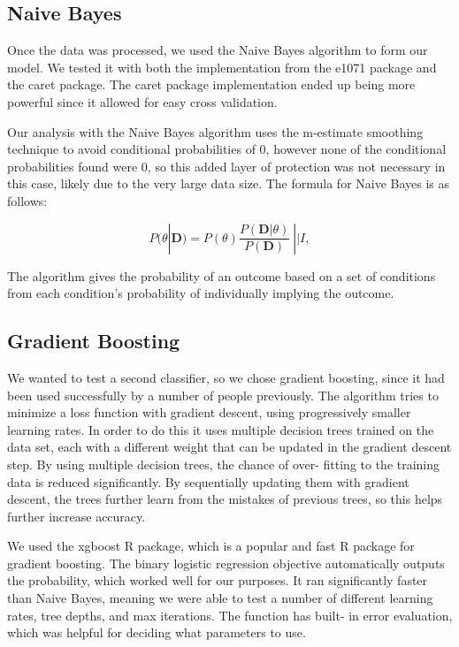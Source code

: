 \documentclass[fleqn,10pt]{SelfArx} %
\begin{document}
\subsection{Naive Bayes}
Once the data was processed, we used the Naive Bayes algorithm to form our model. We tested it with both the implementation from the e1071 package and the caret package. The caret package implementation ended up being more powerful since it allowed for easy cross validation. 

Our analysis with the Naive Bayes algorithm uses the m-estimate smoothing technique to avoid conditional probabilities of 0, however none of the conditional probabilities found were 0, so this added layer of protection was not necessary in this case, likely due to the very large data size. The formula for Naive Bayes is as follows:

\begin{equation}
\label{eq:bayes}
P(\theta|\textbf{D}) = P(\theta ) \frac{P(\textbf{D} |\theta)}{P(\textbf{D})} ~|| I,
\end{equation}

The algorithm gives the probability of an outcome based on a set of conditions from each condition’s probability of individually implying the outcome.


\subsection{Gradient Boosting}
We wanted to test a second classifier, so we chose gradient boosting, since it had been used successfully by a number of people previously. The algorithm tries to minimize a loss function with gradient descent, using progressively smaller learning rates. In order to do this it uses multiple decision trees trained on the data set, each with a different weight that can be updated in the gradient descent step. By using multiple decision trees, the chance of over- fitting to the training data is reduced significantly. By sequentially updating them with gradient descent, the trees further learn from the mistakes of previous trees, so this helps further increase accuracy. 

We used the xgboost R package, which is a popular and fast R package for gradient boosting. The binary logistic regression objective automatically outputs the probability, which worked well for our purposes. It ran significantly faster than Naive Bayes, meaning we were able to test a number of different learning rates, tree depths, and max iterations. The function has built- in error evaluation, which was helpful for deciding what parameters to use. 
\end{document}
